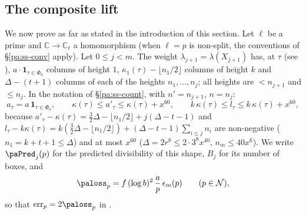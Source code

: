 \documentclass[10pt]{amsart}
\theoremstyle{definition}
\theoremstyle{remark}
\newcommand{\C}{\mathbb C}
\providecommand{\auPa}{\Phi_a}
\providecommand{\auerr}{\operatorname{err}}
\begin{document}
\subsection{The composite lift}\label{pa:ss-divis}
We now prove {\cite[Proposition~14.20]{P46}} as far as stated in the introduction of this section.
Let $\ell$ be a prime and $\C\to\C_\ell$ a homomorphism (when $\ell=p$ is non-split, the
conventions of \S\ref{pa:ss-conv} apply). Let $0\le j<m$. The weight $\lambda_{j+1}=\lambda(X_{j+1})$
has, at $\tau$ (see {\cite[\S14.3]{P46}}), $a\cdot\mathbf 1_{\tau\in\auPa}$ columns of height $1$,
$\kappa_1(\tau)-\lfloor n_1/2\rfloor$ columns of height $k$ and $\Delta-(t+1)$ columns of each of
the heights $n_1,\dots,n_j$; all heights are $<n_{j+1}$ and $\le n_j$. In the notation of
\S\ref{pa:ss-count}, with $n'=n_{j+1}$, $n=n_j$:
\begin{equation}\label{pa:eq-diag}
a_\tau=a\,\mathbf 1_{\tau\in\auPa},\qquad\kappa(\tau)\le a'_\tau\le\kappa(\tau)+x^{60},\qquad
k\,\kappa(\tau)\le l_\tau\le k\,\kappa(\tau)+x^{60},
\end{equation}
because $a'_\tau-\kappa(\tau)=\tfrac32\Delta-\lfloor n_1/2\rfloor+j(\Delta-t-1)$ and
$l_\tau-k\kappa(\tau)=k(\tfrac32\Delta-\lfloor n_1/2\rfloor)+(\Delta-t-1)\sum_{i\le j}n_i$ are
non-negative ($n_1=k+t+1\le\Delta$) and at most $x^{60}$ ($\Delta=2r^8\le2\cdot3^8x^{40}$,
$n_m\le40x^6$). We write $\paPred_j(p)$ for the
predicted divisibility of this shape, $B_j$ for its number of boxes, and
\[
\paloss_p=f\,(\log b)^2\,\frac ap\,\epsilon_m(p)\qquad(p\in\mathcal N),
\]
so that $\auerr_p=2\paloss_p$ in {\cite[(45)]{P46}}.
\end{document}
